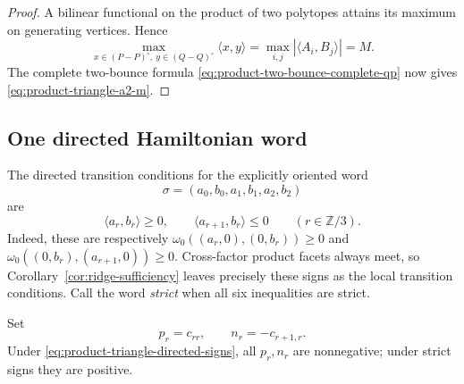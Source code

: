 \begin{unverified}
\begin{proof}
A bilinear functional on the product of two polytopes attains its maximum on
generating vertices.  Hence
\[
 \max_{x\in(P-P)^\circ,\ y\in(Q-Q)^\circ}\langle x,y\rangle
 =\max_{i,j}|\langle A_i,B_j\rangle|=M.
\]
The complete two-bounce formula
\eqref{eq:product-two-bounce-complete-qp} now gives
\eqref{eq:product-triangle-a2-m}.
\end{proof}
\end{unverified}

\subsection{One directed Hamiltonian word}
\label{subsec:product-triangle-one-word}

The directed transition conditions for the explicitly oriented word
\[
 \sigma=(a_0,b_0,a_1,b_1,a_2,b_2)
\]
are
\begin{equation}
\label{eq:product-triangle-directed-signs}
 \langle a_r,b_r\rangle\geq0,
 \qquad
 \langle a_{r+1},b_r\rangle\leq0
 \qquad(r\in\mathbb Z/3).
\end{equation}
Indeed, these are respectively
\(\omega_0((a_r,0),(0,b_r))\geq0\) and
\(\omega_0((0,b_r),(a_{r+1},0))\geq0\).
Cross-factor product facets always meet, so
Corollary~\ref{cor:ridge-sufficiency} leaves precisely these signs as the
local transition conditions.  Call the word \emph{strict} when all six
inequalities are strict.

Set
\begin{equation}
\label{eq:product-triangle-pn}
 p_r=c_{rr},\qquad n_r=-c_{r+1,r}.
\end{equation}
Under \eqref{eq:product-triangle-directed-signs}, all \(p_r,n_r\) are
nonnegative; under strict signs they are positive.

